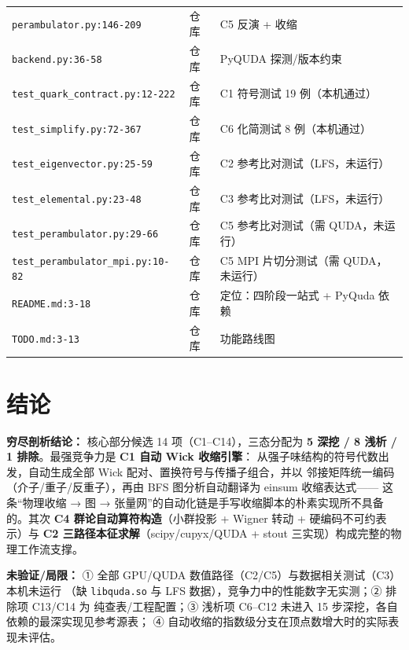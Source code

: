 \documentclass[UTF8]{ctexart}
\begin{document}
{\begin{xltabular}{\textwidth}{XlX}
\texttt{\nolinkurl{perambulator.py:146-209}} & 仓库 & C5 反演 + 收缩 \\
\texttt{\nolinkurl{backend.py:36-58}} & 仓库 & PyQUDA 探测/版本约束 \\
\texttt{\nolinkurl{test_quark_contract.py:12-222}} & 仓库 & C1 符号测试 19 例（本机通过） \\
\texttt{\nolinkurl{test_simplify.py:72-367}} & 仓库 & C6 化简测试 8 例（本机通过） \\
\texttt{\nolinkurl{test_eigenvector.py:25-59}} & 仓库 & C2 参考比对测试（LFS，未运行） \\
\texttt{\nolinkurl{test_elemental.py:23-48}} & 仓库 & C3 参考比对测试（LFS，未运行） \\
\texttt{\nolinkurl{test_perambulator.py:29-66}} & 仓库 & C5 参考比对测试（需 QUDA，未运行） \\
\texttt{\nolinkurl{test_perambulator_mpi.py:10-82}} & 仓库 & C5 MPI 片切分测试（需 QUDA，未运行） \\
\texttt{\nolinkurl{README.md:3-18}} & 仓库 & 定位：四阶段一站式 + PyQuda 依赖 \\
\texttt{\nolinkurl{TODO.md:3-13}} & 仓库 & 功能路线图 \\
\bottomrule
\end{xltabular}}

\section{结论}
\begin{conclbox}
\textbf{穷尽剖析结论：} 核心部分候选 14 项（C1--C14），三态分配为
\textbf{5 深挖 / 8 浅析 / 1 排除}。最强竞争力是 \textbf{C1 自动 Wick 收缩引擎}：
从强子味结构的符号代数出发，自动生成全部 Wick 配对、置换符号与传播子组合，并以
邻接矩阵统一编码（介子/重子/反重子），再由 BFS 图分析自动翻译为 einsum 收缩表达式——
这条``物理收缩 → 图 → 张量网''的自动化链是手写收缩脚本的朴素实现所不具备的。其次
\textbf{C4 群论自动算符构造}（小群投影 + Wigner 转动 + 硬编码不可约表示）与
\textbf{C2 三路径本征求解}（scipy/cupyx/QUDA + stout 三实现）构成完整的物理工作流支撑。
\end{conclbox}
\begin{warnbox}
\textbf{未验证/局限：} ① 全部 GPU/QUDA 数值路径（C2/C5）与数据相关测试（C3）本机未运行
（缺 \texttt{\nolinkurl{libquda.so}} 与 LFS 数据），竞争力中的性能数字无实测；② 排除项 C13/C14 为
纯查表/工程配置；③ 浅析项 C6--C12 未进入 15 步深挖，各自依赖的最深实现见参考源表；
④ 自动收缩的指数级分支在顶点数增大时的实际表现未评估。
\end{warnbox}
\end{document}
